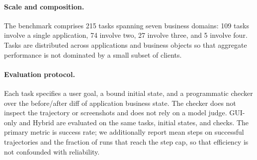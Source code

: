 \paragraph{Scale and composition.}
The benchmark comprises 215 tasks spanning seven business domains: 109 tasks involve a single application, 74 involve two, 27 involve three, and 5 involve four. Tasks are distributed across applications and business objects so that aggregate performance is not dominated by a small subset of clients.

\paragraph{Evaluation protocol.}
Each task specifies a user goal, a bound initial state, and a programmatic checker over the before/after diff of application business state. The checker does not inspect the trajectory or screenshots and does not rely on a model judge. GUI-only and Hybrid are evaluated on the same tasks, initial states, and checks. The primary metric is success rate; we additionally report mean steps on successful trajectories and the fraction of runs that reach the step cap, so that efficiency is not confounded with reliability.
